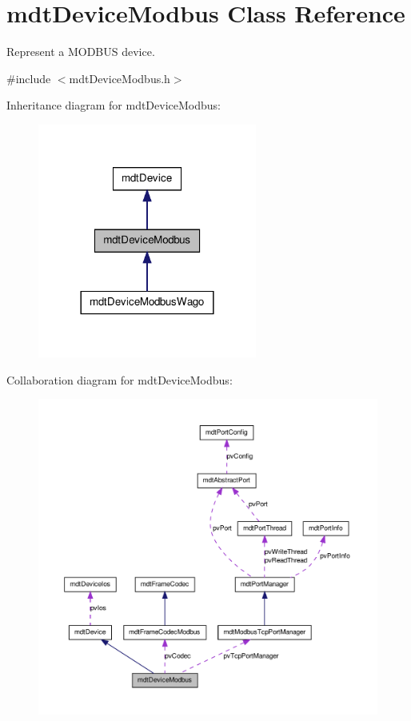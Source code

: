 \hypertarget{classmdt_device_modbus}{
\section{mdtDeviceModbus Class Reference}
\label{classmdt_device_modbus}
}


Represent a MODBUS device.  




{\ttfamily \#include $<$mdtDeviceModbus.h$>$}



Inheritance diagram for mdtDeviceModbus:
\nopagebreak
\begin{figure}[H]
\begin{center}
\leavevmode
\includegraphics[width=204pt]{classmdt_device_modbus__inherit__graph}
\end{center}
\end{figure}


Collaboration diagram for mdtDeviceModbus:
\nopagebreak
\begin{figure}[H]
\begin{center}
\leavevmode
\includegraphics[width=400pt]{classmdt_device_modbus__coll__graph}
\end{center}
\end{figure}
